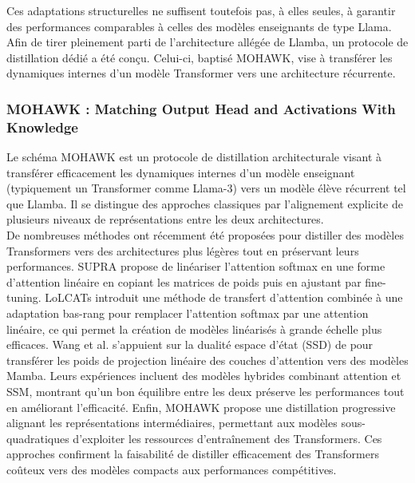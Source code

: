 Ces adaptations structurelles ne suffisent toutefois pas, à elles seules, à garantir des performances comparables à celles des modèles enseignants de type Llama. Afin de tirer pleinement parti de l’architecture allégée de Llamba, un protocole de distillation dédié a été conçu. Celui-ci, baptisé MOHAWK, vise à transférer les dynamiques internes d’un modèle Transformer vers une architecture récurrente.

\subsubsection{MOHAWK : Matching Output Head and Activations With Knowledge}

Le schéma MOHAWK est un protocole de distillation architecturale visant à transférer efficacement les dynamiques internes d’un modèle enseignant (typiquement un Transformer comme Llama-3) vers un modèle élève récurrent tel que Llamba. Il se distingue des approches classiques par l’alignement explicite de plusieurs niveaux de représentations entre les deux architectures.\\

De nombreuses méthodes ont récemment été proposées pour distiller des modèles Transformers vers des architectures plus légères tout en préservant leurs performances. SUPRA \citep{mercat2024supra} propose de linéariser l’attention softmax en une forme d’attention linéaire en copiant les matrices de poids puis en ajustant par fine-tuning. LoLCATs \citep{zhang2024lolcats} introduit une méthode de transfert d’attention combinée à une adaptation bas-rang pour remplacer l’attention softmax par une attention linéaire, ce qui permet la création de modèles linéarisés à grande échelle plus efficaces. Wang et al. \citep{wang2025ssd} s’appuient sur la dualité espace d’état (SSD) de \citep{dao2024ssd} pour transférer les poids de projection linéaire des couches d’attention vers des modèles Mamba. Leurs expériences incluent des modèles hybrides combinant attention et SSM, montrant qu’un bon équilibre entre les deux préserve les performances tout en améliorant l’efficacité. Enfin, MOHAWK \citep{bick2024transformers} propose une distillation progressive alignant les représentations intermédiaires, permettant aux modèles sous-quadratiques d’exploiter les ressources d’entraînement des Transformers. Ces approches confirment la faisabilité de distiller efficacement des Transformers coûteux vers des modèles compacts aux performances compétitives.\\

